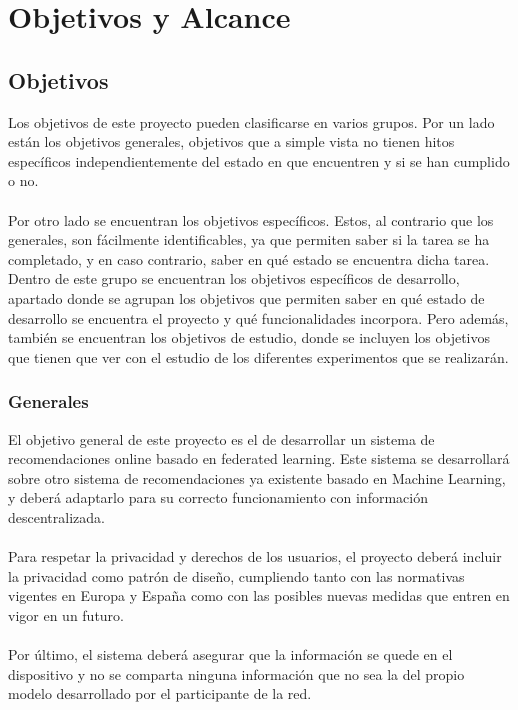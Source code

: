 \chapter{Objetivos y Alcance}
\thispagestyle{fancy}
\section{Objetivos}
Los objetivos de este proyecto pueden clasificarse en varios grupos. Por un lado están los objetivos generales, objetivos que a simple vista no tienen hitos específicos independientemente del estado en que encuentren y si se han cumplido o no.
\\ \\
Por otro lado se encuentran los objetivos específicos. Estos, al contrario que los generales, son fácilmente identificables, ya que permiten saber si la tarea se ha completado, y en caso contrario, saber en qué estado se encuentra dicha tarea. Dentro de este grupo se encuentran los objetivos específicos de desarrollo, apartado donde se agrupan los objetivos que permiten saber en qué estado de desarrollo se encuentra el proyecto y qué funcionalidades incorpora. Pero además, también se encuentran los objetivos de estudio, donde se incluyen los objetivos que tienen que ver con el estudio de los diferentes experimentos que se realizarán. 

\subsection{Generales}
El objetivo general de este proyecto es el de desarrollar un sistema de recomendaciones online basado en federated learning. Este sistema se desarrollará sobre otro sistema de recomendaciones ya existente basado en Machine Learning, y deberá adaptarlo para su correcto funcionamiento con información descentralizada.
\\ \\
Para respetar la privacidad y derechos de los usuarios, el proyecto deberá incluir la privacidad como patrón de diseño, cumpliendo tanto con las normativas vigentes en Europa y España como con las posibles nuevas medidas que entren en vigor en un futuro. 
\\ \\
Por último, el sistema deberá asegurar que la información se quede en el dispositivo y no se comparta ninguna información que no sea la del propio modelo desarrollado por el participante de la red.


